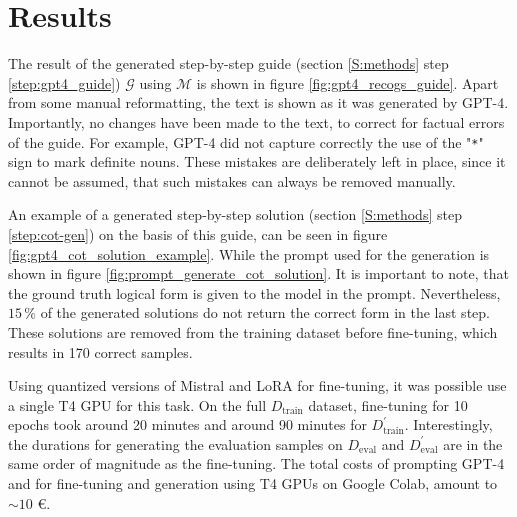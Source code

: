 \documentclass[11pt]{article}
\begin{document}


    \section{Results}
    The result of the generated step-by-step guide (section \ref{S:methods} step \ref{step:gpt4_guide})
    $\mathcal{G}$ using $\mathcal{M}$ is shown in figure \ref{fig:gpt4_recogs_guide}.
    Apart from some manual reformatting, the text is shown as it was generated by GPT-4.
    Importantly, no changes have been made to the text, to correct for factual errors of the guide.
    For example, GPT-4 did not capture correctly the use of the "\texttt{*}" sign to mark definite nouns.
    These mistakes are deliberately left in place, since it cannot be assumed,
    that such mistakes can always be removed manually.

    An example of a generated step-by-step solution (section \ref{S:methods} step \ref{step:cot-gen}) on the basis of this guide,
    can be seen in figure \ref{fig:gpt4_cot_solution_example}.
    While the prompt used for the generation is shown in figure \ref{fig:prompt_generate_cot_solution}.
    It is important to note, that the ground truth logical form is given to the model in the prompt.
    Nevertheless, $15\,\%$ of the generated solutions do not return the correct form in the last step.
    These solutions are removed from the training dataset before fine-tuning, which results in 170 correct samples.

    Using quantized versions of Mistral \cite{unsloth_unslothmistral-7b-instruct-v02-bnb-4bit_2024} and LoRA for fine-tuning,
    it was possible use a single T4 GPU for this task.
    On the full $D_\mathrm{train}$ dataset, fine-tuning for 10 epochs took around 20 minutes and around 90 minutes
    for $D_\mathrm{train}^\prime$.
    Interestingly, the durations for generating the evaluation samples on $D_\mathrm{eval}$ and $D_\mathrm{eval}^\prime$
    are in the same order of magnitude as the fine-tuning.
    The total costs of prompting GPT-4 and for fine-tuning and generation using T4 GPUs on Google Colab, amount to $\sim 10$ \euro.
\end{document}
